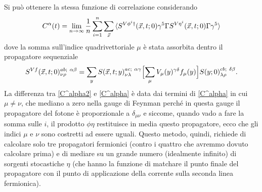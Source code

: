 \documentclass[LaM]{sapthesis}
\begin{document}
	Si può ottenere la stessa funzione di correlazione considerando
	\begin{equation}
	\label{C^alpha2}
		C^\alpha(t)=\lim_{n\to\infty}\frac{1}{n}\sum_{i=1}^{n}\sum_{\vec{x}} \braket{S^{V\phi^i\dagger}(\vec{x},t;0)\gamma^5\Gamma S^{V\eta^i}(\vec{x},t;0)\Gamma\gamma^5}
	\end{equation}
	dove la somma sull'indice quadrivettoriale $\mu$ è stata assorbita dentro il propagatore sequenziale
	\begin{equation}
		S^{V f}(\vec{x},t;0)_{\nu\rho}^{a b; \ \alpha \beta}=\sum_yS(\vec{x},t;y)_{\nu\lambda}^{a c; \ \alpha \gamma}\Bigl[\sum_\mu V_\mu(y)^{\gamma \delta}f_\mu(y)\Bigr]S(y;0)_{\lambda\rho}^{c b; \ \delta \beta}.
	\end{equation}
	La differenza tra \eqref{C^alpha2} e \eqref{C^alpha} è data dai termini di \eqref{C^alpha} in cui $\mu\ne\nu$, che mediano a zero nella gauge di Feynman \color{red}perché in questa gauge il propagatore del fotone è proporzionale a $\delta_{\mu\nu}$ e siccome, quando vado a fare la somma sulle $i$, il prodotto $\phi\eta$ restituisce in media questo propagatore, ecco che gli indici $\mu$ e $\nu$ sono costretti ad essere uguali\color{black}.
	Questo metodo, quindi, richiede di calcolare solo tre propagatori fermionici (contro i quattro che avremmo dovuto calcolare prima) e di mediare su un grande numero (idealmente infinito) di sorgenti stocastiche $\eta$ (che hanno la funzione di matchare il punto finale del propagatore con il punto di applicazione della corrente sulla seconda linea fermionica).
	
\end{document}
